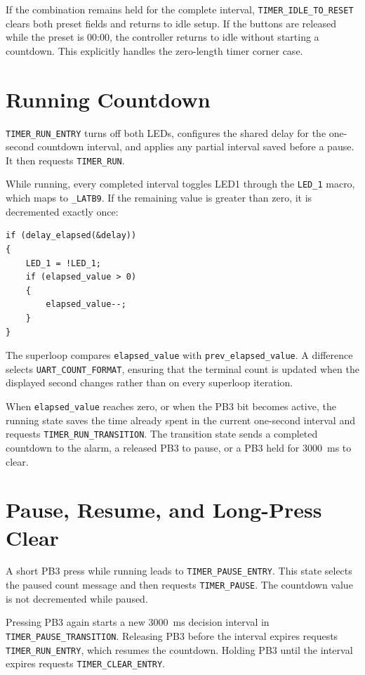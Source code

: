 \documentclass[11pt]{article}
\newcommand{\state}[1]{\texttt{#1}}
\newcommand{\code}[1]{\texttt{#1}}
\begin{document}
If the combination remains held for the complete interval, \state{TIMER\_IDLE\_TO\_RESET} clears both preset fields and returns to idle setup. If the buttons are released while the preset is 00:00, the controller returns to idle without starting a countdown. This explicitly handles the zero-length timer corner case.

\section{Running Countdown}

\state{TIMER\_RUN\_ENTRY} turns off both LEDs, configures the shared delay for the one-second countdown interval, and applies any partial interval saved before a pause. It then requests \state{TIMER\_RUN}.

While running, every completed interval toggles LED1 through the \code{LED\_1} macro, which maps to \code{\_LATB9}. If the remaining value is greater than zero, it is decremented exactly once:

\begin{verbatim}
if (delay_elapsed(&delay))
{
    LED_1 = !LED_1;
    if (elapsed_value > 0)
    {
        elapsed_value--;
    }
}
\end{verbatim}

The superloop compares \code{elapsed\_value} with \code{prev\_elapsed\_value}. A difference selects \code{UART\_COUNT\_FORMAT}, ensuring that the terminal count is updated when the displayed second changes rather than on every superloop iteration.

When \code{elapsed\_value} reaches zero, or when the PB3 bit becomes active, the running state saves the time already spent in the current one-second interval and requests \state{TIMER\_RUN\_TRANSITION}. The transition state sends a completed countdown to the alarm, a released PB3 to pause, or a PB3 held for 3000~ms to clear.

\section{Pause, Resume, and Long-Press Clear}

A short PB3 press while running leads to \state{TIMER\_PAUSE\_ENTRY}. This state selects the paused count message and then requests \state{TIMER\_PAUSE}. The countdown value is not decremented while paused.

Pressing PB3 again starts a new 3000~ms decision interval in \state{TIMER\_PAUSE\_TRANSITION}. Releasing PB3 before the interval expires requests \state{TIMER\_RUN\_ENTRY}, which resumes the countdown. Holding PB3 until the interval expires requests \state{TIMER\_CLEAR\_ENTRY}.
\end{document}

